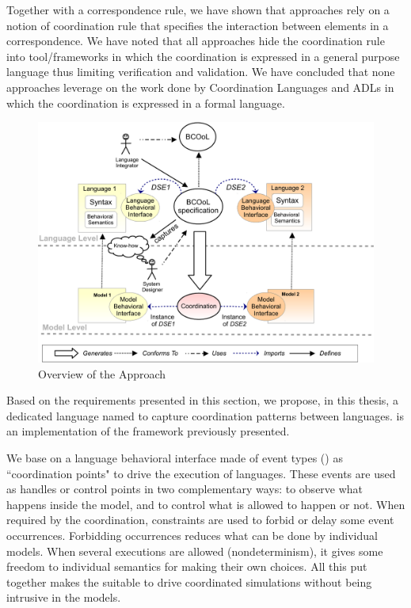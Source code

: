 Together with a correspondence rule, we have shown that approaches rely on a notion of coordination rule that specifies the interaction between elements in a correspondence. We have noted that all approaches hide the coordination rule into tool/frameworks in which the coordination is expressed in a general purpose language thus limiting verification and validation. We have concluded that none approaches leverage on the work done by Coordination Languages and ADLs in which the coordination is expressed in a formal language.  

\begin{figure}
	\begin{center}
		\includegraphics[width=1\textwidth]{framework/figs/bcool}
		\caption{Overview of the Approach}
		\label{fig:bcool}
	\end{center}
\end{figure}

Based on the requirements presented in this section, we propose, in this thesis, a dedicated language named \bcool to capture coordination patterns between languages. \bcool is an implementation of the framework previously presented.  

We base on a language behavioral interface made of event types (\ie \dse\cite{sle13-combemale}) as ``coordination points" to drive the execution of languages. These events are used as handles or control points in two complementary ways: to observe what happens inside the model, and to control what is allowed to happen or not. When required by the coordination, constraints are used to forbid or delay some event occurrences. Forbidding occurrences reduces what can be done by individual models. When several executions are allowed
(nondeterminism), it gives some freedom to individual semantics for making their own choices. All this put together makes the \dse suitable to drive coordinated simulations without being intrusive in the models. 

